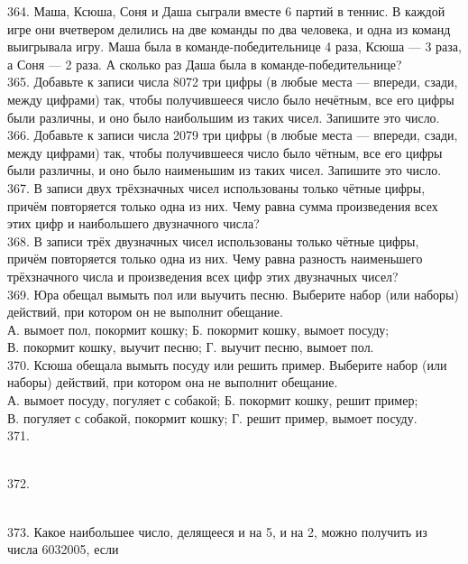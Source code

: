 364. Маша, Ксюша, Соня и Даша сыграли вместе 6 партий в теннис. В каждой игре они вчетвером делились на две команды по два человека, и одна из команд выигрывала игру. Маша была в команде-победительнице 4 раза, Ксюша --- 3 раза, а Соня --- 2 раза. А сколько раз Даша была в команде-победительнице?\\
365. Добавьте к записи числа 8072 три цифры (в любые места --- впереди, сзади, между цифрами) так, чтобы получившееся число было нечётным, все его цифры были различны, и оно было наибольшим из таких чисел. Запишите это число.\\
366. Добавьте к записи числа 2079 три цифры (в любые места --- впереди, сзади, между цифрами) так, чтобы получившееся число было чётным, все его цифры были различны, и оно было наименьшим из таких чисел. Запишите это число.\\
367. В записи двух трёхзначных чисел использованы только чётные цифры, причём повторяется только одна из них. Чему равна сумма произведения всех этих цифр
и наибольшего двузначного числа?\\
368. В записи трёх двузначных чисел использованы только чётные цифры, причём повторяется только одна из них. Чему равна разность наименьшего
трёхзначного числа и произведения всех цифр этих двузначных чисел?\\
369. Юра обещал вымыть пол или выучить песню. Выберите набор (или наборы) действий, при котором он не выполнит обещание.\\
А. вымоет пол, покормит кошку;  \qquad \qquad Б. покормит кошку, вымоет посуду;\\
В. покормит кошку, выучит песню; \qquad \quad Г. выучит песню, вымоет пол.\\
370. Ксюша обещала вымыть посуду или решить пример. Выберите набор (или наборы) действий, при котором она не выполнит обещание.\\
А. вымоет посуду, погуляет с собакой;  \qquad \quad Б. покормит кошку, решит пример;\\
В. погуляет с собакой, покормит кошку; \qquad  Г. решит пример, вымоет посуду.\\
371. \begin{figure}[ht!]
\end{figure}\\
372. \begin{figure}[ht!]
\end{figure}\\
373. Какое наибольшее число, делящееся и на 5, и на 2, можно получить из числа 6032005, если
